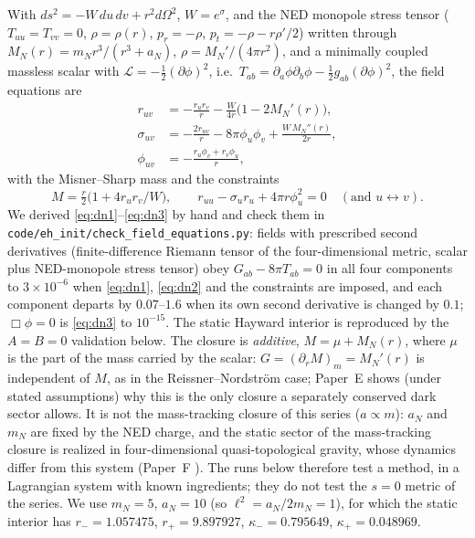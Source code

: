 \documentclass[11pt]{article}
\begin{document}
With $ds^2=-W\,du\,dv+r^2d\Omega^2$, $W=e^{\sigma}$, and the NED monopole stress tensor ($T_{uu}=T_{vv}=0$, $\rho=\rho(r)$, $p_r=-\rho$, $p_t=-\rho-r\rho'/2$) written through $M_N(r)=m_Nr^3/(r^3+a_N)$, $\rho=M_N'/(4\pi r^2)$, and a minimally coupled massless scalar with $\mathcal L=-\tfrac12(\partial\phi)^2$, i.e.\ $T_{ab}=\partial_a\phi\partial_b\phi-\tfrac12g_{ab}(\partial\phi)^2$, the field equations are
\begin{align}
r_{uv}&=-\frac{r_ur_v}{r}-\frac{W}{4r}\bigl(1-2M_N'(r)\bigr), \label{eq:dn1}\\
\sigma_{uv}&=-\frac{2r_{uv}}{r}-8\pi\phi_u\phi_v+\frac{W\,M_N''(r)}{2r},\label{eq:dn2}\\
\phi_{uv}&=-\frac{r_u\phi_v+r_v\phi_u}{r},\label{eq:dn3}
\end{align}
with the Misner--Sharp mass and the constraints
\begin{equation}
M=\tfrac r2\bigl(1+4r_ur_v/W\bigr),\qquad r_{uu}-\sigma_ur_u+4\pi r\phi_u^2=0\quad(\text{and }u\leftrightarrow v).
\end{equation} We derived \eqref{eq:dn1}--\eqref{eq:dn3} by hand and check them in \texttt{code/eh\_init/check\_field\_equations.py}: fields with prescribed second derivatives (finite-difference Riemann tensor of the four-dimensional metric, scalar plus NED-monopole stress tensor) obey $G_{ab}-8\pi T_{ab}=0$ in all four components to $3\times10^{-6}$ when \eqref{eq:dn1}, \eqref{eq:dn2} and the constraints are imposed, and each component departs by $0.07$--$1.6$ when its own second derivative is changed by $0.1$; $\Box\phi=0$ is \eqref{eq:dn3} to $10^{-15}$. The static Hayward interior is reproduced by the $A=B=0$ validation below. The closure is \emph{additive}, $M=\mu+M_N(r)$, where $\mu$ is the part of the mass carried by the scalar: $G=(\partial_rM)_m=M_N'(r)$ is independent of $M$, as in the Reissner--Nordstr\"om case; Paper~E \citep{PaperE} shows (under stated assumptions) why this is the only closure a separately conserved dark sector allows. It is not the mass-tracking closure of this series ($a\propto m$): $a_N$ and $m_N$ are fixed by the NED charge, and the static sector of the mass-tracking closure is realized in four-dimensional quasi-topological gravity, whose dynamics differ from this system (Paper~F \citep{PaperF}). The runs below therefore test a method, in a Lagrangian system with known ingredients; they do not test the $s=0$ metric of the series. We use $m_N=5$, $a_N=10$ (so $\ell^2=a_N/2m_N=1$), for which the static interior has $r_-=1.057475$, $r_+=9.897927$, $\kappa_-=0.795649$, $\kappa_+=0.048969$.
\end{document}
